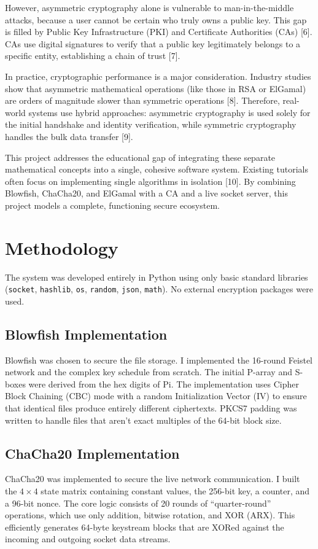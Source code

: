 \documentclass[12pt,a4paper]{article}
\begin{document}
However, asymmetric cryptography alone is vulnerable to man-in-the-middle attacks, because a user cannot be certain who truly owns a public key. This gap is filled by Public Key Infrastructure (PKI) and Certificate Authorities (CAs) [6]. CAs use digital signatures to verify that a public key legitimately belongs to a specific entity, establishing a chain of trust [7]. 

In practice, cryptographic performance is a major consideration. Industry studies show that asymmetric mathematical operations (like those in RSA or ElGamal) are orders of magnitude slower than symmetric operations [8]. Therefore, real-world systems use hybrid approaches: asymmetric cryptography is used solely for the initial handshake and identity verification, while symmetric cryptography handles the bulk data transfer [9]. 

This project addresses the educational gap of integrating these separate mathematical concepts into a single, cohesive software system. Existing tutorials often focus on implementing single algorithms in isolation [10]. By combining Blowfish, ChaCha20, and ElGamal with a CA and a live socket server, this project models a complete, functioning secure ecosystem.

\section{Methodology}
The system was developed entirely in Python using only basic standard libraries (\texttt{socket}, \texttt{hashlib}, \texttt{os}, \texttt{random}, \texttt{json}, \texttt{math}). No external encryption packages were used. 

\subsection{Blowfish Implementation}
Blowfish was chosen to secure the file storage. I implemented the 16-round Feistel network and the complex key schedule from scratch. The initial P-array and S-boxes were derived from the hex digits of Pi. The implementation uses Cipher Block Chaining (CBC) mode with a random Initialization Vector (IV) to ensure that identical files produce entirely different ciphertexts. PKCS7 padding was written to handle files that aren't exact multiples of the 64-bit block size.

\subsection{ChaCha20 Implementation}
ChaCha20 was implemented to secure the live network communication. I built the $4 \times 4$ state matrix containing constant values, the 256-bit key, a counter, and a 96-bit nonce. The core logic consists of 20 rounds of ``quarter-round'' operations, which use only addition, bitwise rotation, and XOR (ARX). This efficiently generates 64-byte keystream blocks that are XORed against the incoming and outgoing socket data streams.
\end{document}
